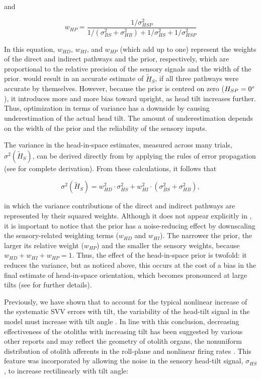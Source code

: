 and

\begin{equation}
\label{p1:eqn9}
w_{HP} = \frac{1 / \sigma^2_{HSP}}{1 / (\sigma^2_{BS} + \sigma^2_{HB}) + 1/\sigma^2_{HS} + 1/\sigma^2_{HSP}}
\end{equation}

In this equation, $w_{HD}$, $w_{HI}$, and $w_{HP}$ (which add up to one) represent the weights of the direct and indirect pathways and the prior, respectively, which are proportional to the relative precision of the sensory signals and the width of the prior.  would result in an accurate estimate of $\tilde{H}_S$, if all three pathways were accurate by themselves. However, because the prior is centred on zero ($H_{SP} = 0\degree$), it introduces more and more bias toward upright, as head tilt increases further. Thus, optimization in terms of variance has a downside by causing underestimation of the actual head tilt. The amount of underestimation depends on the width of the prior and the reliability of the sensory inputs.

The variance in the head-in-space estimates, measured across many trials, $\sigma^2(\tilde{H}_S)$, can be derived directly from  by applying the rules of error propagation (see  for complete derivation). From these calculations, it follows that 

\begin{equation}
\label{p1:eqn10}
\sigma^2(\tilde{H}_{S}) = w^2_{HD} \cdot \sigma^2_{HS} + w^2_{HI} \cdot (\sigma^2_{BS} + \sigma^2_{HB}),
\end{equation}

in which the variance contributions of the direct and indirect pathways are represented by their squared weights. Although it does not appear explicitly in , it is important to notice that the prior has a noise-reducing effect by downscaling the sensory-related weighting terms ($w_{HD}$ and $w_{HI}$). The narrower the prior, the larger its relative weight ($w_{HP}$) and the smaller the sensory weights, because $w_{HD} + w_{HI} + w_{HP} = 1$. Thus, the effect of the head-in-space prior is twofold: it reduces the variance, but as noticed above, this occurs at the cost of a bias in the final estimate of head-in-space orientation, which becomes pronounced at large tilts (see  for further details). 

Previously, we have shown that to account for the typical nonlinear increase of the systematic SVV errors with tilt, the variability of the head-tilt signal in the model must increase with tilt angle \cite{devrijer2008,devrijer2009}. In line with this conclusion, decreasing effectiveness of the otoliths with increasing tilt has been suggested by various other reports \cite{schone1968,tarnutzer2009,tarnutzer2010} and may reflect the geometry of otolith organs, the nonuniform distribution of otolith afferents in the roll-plane and nonlinear firing rates \cite{tarnutzer2010}. This feature was incorporated by allowing the noise in the sensory head-tilt signal, $\sigma_{HS}$, to increase rectilinearly with tilt angle: 

